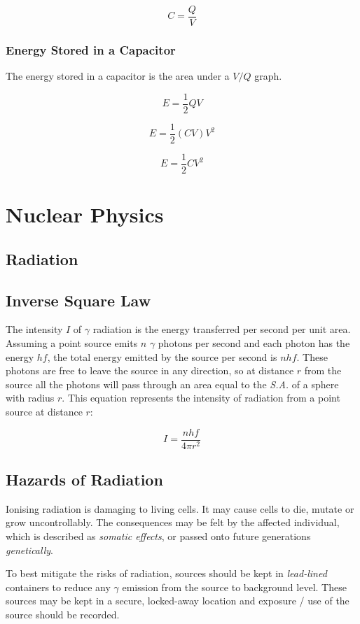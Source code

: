 \documentclass[12pt]{article}
\begin{document}
\[C = \dfrac{Q}{V}\]

\subsubsection{Energy Stored in a Capacitor}
\label{sec:org319b0c4}

The energy stored in a capacitor is the area under a \(V/Q\) graph.

\[E = \dfrac{1}{2} QV\]

\[E = \dfrac{1}{2} (CV)V^2\]

\[E = \dfrac{1}{2} CV^2\]

\section{Nuclear Physics}
\label{sec:org0ab04b8}
\subsection{Radiation}
\label{sec:org24c0efc}
\subsection{Inverse Square Law}
\label{sec:org7c90434}

The intensity \(I\) of \(\gamma\) radiation is the energy transferred per second per unit area. Assuming a point source emits \(n\) \(\gamma\) photons per second and each photon has the energy \(hf\), the total energy emitted by the source per second is \(nhf\). These photons are free to leave the source in any direction, so at distance \(r\) from the source all the photons will pass through an area equal to the \emph{S.A.} of a sphere with radius \(r\). This equation represents the intensity of radiation from a point source at distance \(r\):

\[I = \dfrac{nhf}{4 \pi r^2}\]

\subsection{Hazards of Radiation}
\label{sec:org3ea502f}

Ionising radiation is damaging to living cells. It may cause cells to die, mutate or grow uncontrollably. The consequences may be felt by the affected individual, which is described as \emph{somatic effects}, or passed onto future generations \emph{genetically}.

To best mitigate the risks of radiation, sources should be kept in \emph{lead-lined} containers to reduce any \(\gamma\) emission from the source to background level. These sources may be kept in a secure, locked-away location and exposure / use of the source should be recorded.
\end{document}
